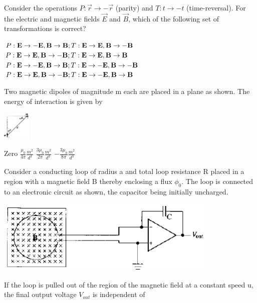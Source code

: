 \documentclass{exam}
\begin{document}
\begin{questions}
\question Consider the operations $P:\vec{r}\rightarrow-\vec{r}$ (parity) and $T:t\rightarrow-t$ (time-reversal). For the electric and magnetic fields $\vec{E}$ and $\vec{B}$, which of the following set of transformations is correct?\hfill{}

\begin{choices}
	\begin{multicols}{2}
	 \choice $P:\vec{E}\rightarrow-\vec{E},\vec{B}\rightarrow\vec{B};\\ T:\vec{E}\rightarrow\vec{E},\vec{B}\rightarrow-\vec{B}$
	\choice $P:\vec{E}\rightarrow\vec{E},\vec{B}\rightarrow-\vec{B};\\ T:\vec{E}\rightarrow\vec{E},\vec{B}\rightarrow\vec{B}$
	\choice $P:\vec{E}\rightarrow-\vec{E},\vec{B}\rightarrow\vec{B};\\ T:\vec{E}\rightarrow-\vec{E},\vec{B}\rightarrow-\vec{B}$
	\choice $P:\vec{E}\rightarrow\vec{E},\vec{B}\rightarrow-\vec{B};\\ T:\vec{E}\rightarrow-\vec{E},\vec{B}\rightarrow\vec{B}$
	\end{multicols}
\end{choices}

\question Two magnetic dipoles of magnitude m each are placed in a plane as shown. The energy of interaction is given by\hfill{}
	\begin{center}
		\includegraphics[width=0.1\textwidth]{pics/38.png}
	\end{center}


\begin{oneparchoices}
	\choice Zero \choice $\frac{\mu_{0}}{4\pi}\frac{m^{2}}{d^{3}}$ \choice $\frac{3\mu_{0}}{2\pi}\frac{m^{2}}{d^{3}}$ \choice $-\frac{3\mu_{0}}{8\pi}\frac{m^{2}}{d^{3}}$
\end{oneparchoices}

\question Consider a conducting loop of radius a and total loop resistance R placed in a region with a magnetic field B thereby enclosing a flux $\phi_0$. The loop is connected to an electronic circuit as shown, the capacitor being initially uncharged.
	\begin{center}
		\includegraphics[width=0.8\textwidth]{pics/39.png}
	\end{center}
	If the loop is pulled out of the region of the magnetic field at a constant speed u, the final output voltage $V_{out}$ is independent of\hfill{}



\end{questions}
\end{document}
